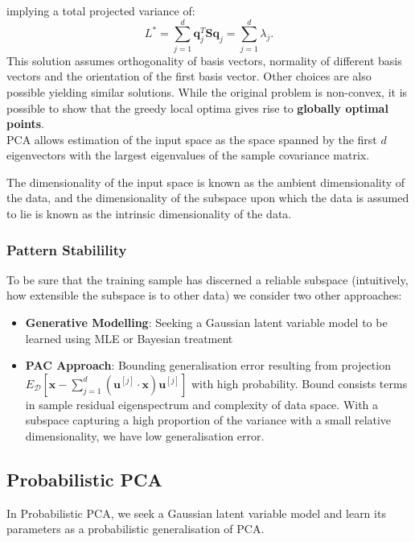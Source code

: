implying a total projected variance of:
\[L^{*}=\sum_{j=1}^{d} \mathbf{q}_j^{T}\mathbf{Sq}_j=\sum_{j=1}^{d} \lambda_j.\] 
This solution assumes orthogonality of basis vectors, normality of different
basis vectors and the orientation of the first basis vector. Other choices are
also possible yielding similar solutions. While the original problem is
non-convex, it is possible to show that the greedy local optima gives rise to
\textbf{globally optimal points}.\\
PCA allows estimation of the input space as the space spanned by the first $d$
eigenvectors with the largest eigenvalues of the sample covariance matrix.
\begin{definition}
  The dimensionality of the input space is known as the ambient dimensionality
  of the data, and the dimensionality of the subspace upon which the data is
  assumed to lie is known as the intrinsic dimensionality of the data.
\end{definition}
\subsubsection{Pattern Stabilility}
To be sure that the training sample has discerned a reliable subspace
(intuitively, how extensible the subspace is to other data) we consider two
other approaches:
\begin{itemize}
  \item \textbf{Generative Modelling}: Seeking a Gaussian latent variable model to be
    learned using MLE or Bayesian treatment
  \item \textbf{PAC Approach}: Bounding generalisation error resulting from
    projection $E_\mathcal{D}\left[ \mathbf{x}-\sum_{j=1}^{d} \left(
    \mathbf{u}^{[j]}\cdot\mathbf{x} \right) \mathbf{u}^{[j]} \right]$ with high
    probability. Bound consists terms in sample residual eigenspectrum and
    complexity of data space. With a subspace capturing a high proportion of
    the variance with a small relative dimensionality, we have low
    generalisation error.
\end{itemize}

\subsection{Probabilistic PCA}
In Probabilistic PCA, we seek a Gaussian latent variable model and learn its parameters
as a probabilistic generalisation of PCA.\@
